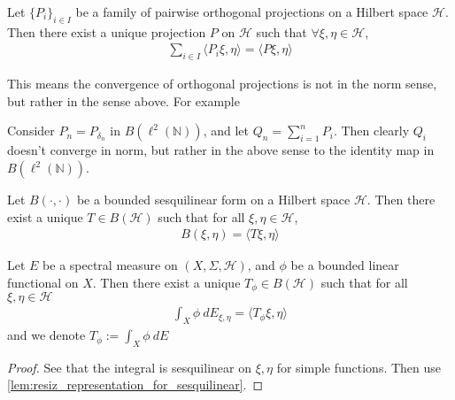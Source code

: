 \begin{lemma}
  Let $\{ P_i \}_{i \in I}$ be a family of pairwise orthogonal
  projections on a Hilbert space $\mathcal{H}$. Then there exist a
  unique projection $P$ on $\mathcal{H}$ such that $\forall \xi, \eta
  \in \mathcal{H}$,
  \begin{align*}
    \sum_{i \in I} \langle P_i \xi ,  \eta \rangle = \langle P \xi ,
    \eta \rangle
  \end{align*}
\end{lemma}
This means the convergence of orthogonal projections is not in the
norm sense, but rather in the sense above. For example
\begin{example}
  Consider $P_n = P_{\delta_n}$ in $B(\ell^{2}(\mathbb{N}))$, and let
  $  Q_n = \sum_{i = 1}^{n} P_i$. Then clearly $Q_i$ doesn't converge
  in norm, but rather in the above sense to the identity map in
  $B(\ell^{2}(\mathbb{N}))$.
\end{example}

\begin{lemma}
  \label{lem:resiz_representation_for_sesquilinear}
  \marginnote{ \scriptsize \it \textcolor{red}{I'm not convinced.
  Need to verify}}
  Let $B(\cdot, \cdot)$ be a bounded sesquilinear form on a Hilbert
  space $\mathcal{H}$. Then there exist a unique $T \in
  B(\mathcal{H})$ such that for all $\xi, \eta \in \mathcal{H}$,
  \begin{align*}
    B(\xi, \eta) = \langle T \xi ,  \eta \rangle
  \end{align*}
\end{lemma}

\begin{proposition}
  \label{prop:spectral_measure_and_integration}
  \marginnote{ \scriptsize \it \textcolor{red}{verify if $\phi$ is a
  linear functional}}
  Let $E$ be a spectral measure on $(X, \Sigma, \mathcal{H})$, and
  $\phi$ be a bounded linear functional on $X$. Then
  there exist a unique $  T_\phi \in B(\mathcal{H})$ such that for
  all $\xi, \eta \in \mathcal{H}$
  \begin{align*}
    \int_X \phi \ d  E_{\xi, \eta} = \langle T_\phi \xi ,  \eta \rangle
  \end{align*}
  and we denote $T_\phi:= \int_X \phi \ d  E$
\end{proposition}
\begin{proof}
  See that the integral is sesquilinear on $\xi, \eta$ for simple
  functions. Then use
  \autoref{lem:resiz_representation_for_sesquilinear}.
\end{proof}

